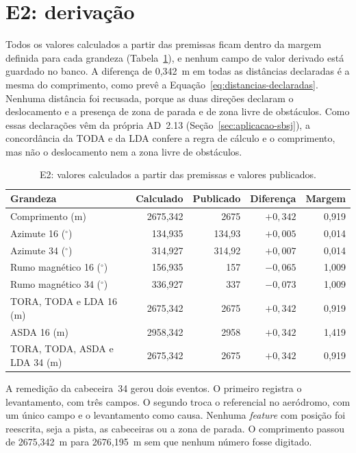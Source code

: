 \section{E2: derivação}\label{sec:res-e2}

Todos os valores calculados a partir das premissas ficam dentro da margem definida para cada grandeza (Tabela~\ref{tab:res-e2}), e nenhum campo de valor derivado está guardado no banco. A diferença de 0,342~m em todas as distâncias declaradas é a mesma do comprimento, como prevê a Equação~\ref{eq:distancias-declaradas}. Nenhuma distância foi recusada, porque as duas direções declaram o deslocamento e a presença de zona de parada e de zona livre de obstáculos. Como essas declarações vêm da própria AD~2.13 (Seção~\ref{sec:aplicacao-sbsj}), a concordância da TODA e da LDA confere a regra de cálculo e o comprimento, mas não o deslocamento nem a zona livre de obstáculos.

\begin{table}[htbp]
    \centering
    \caption{E2: valores calculados a partir das premissas e valores publicados.}
    \label{tab:res-e2}
    \begin{tabular}{l r r r r}
        \toprule
        Grandeza & Calculado & Publicado & Diferença & Margem \\
        \midrule
        Comprimento (m) & 2675,342 & 2675 & $+0{,}342$ & 0,919 \\
        Azimute 16 ($^\circ$) & 134,935 & 134,93 & $+0{,}005$ & 0,014 \\
        Azimute 34 ($^\circ$) & 314,927 & 314,92 & $+0{,}007$ & 0,014 \\
        Rumo magnético 16 ($^\circ$) & 156,935 & 157 & $-0{,}065$ & 1,009 \\
        Rumo magnético 34 ($^\circ$) & 336,927 & 337 & $-0{,}073$ & 1,009 \\
        TORA, TODA e LDA 16 (m) & 2675,342 & 2675 & $+0{,}342$ & 0,919 \\
        ASDA 16 (m) & 2958,342 & 2958 & $+0{,}342$ & 1,419 \\
        TORA, TODA, ASDA e LDA 34 (m) & 2675,342 & 2675 & $+0{,}342$ & 0,919 \\
        \bottomrule
    \end{tabular}
    \par{}
\end{table}

A remedição da cabeceira~34 gerou dois eventos. O primeiro registra o levantamento, com três campos. O segundo troca o referencial no aeródromo, com um único campo e o levantamento como causa. Nenhuma \textit{feature} com posição foi reescrita, seja a pista, as cabeceiras ou a zona de parada. O comprimento passou de 2675,342~m para 2676,195~m sem que nenhum número fosse digitado.

